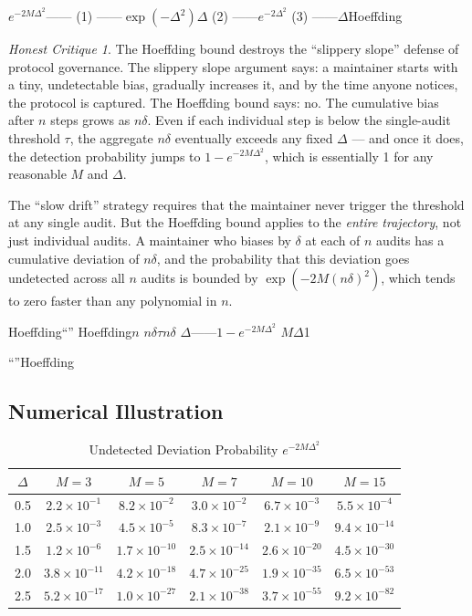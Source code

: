 \documentclass[12pt,a4paper]{article}
\theoremstyle{remark}
\newtheorem{honesthit}{Honest Critique}[section]
\newenvironment{hitbox}{%
  \begin{center}
  \color{red}
  \begin{minipage}{0.92\textwidth}
  \begin{honesthit}
}{%
  \end{honesthit}
  \end{minipage}
  \end{center}
}
\begin{document}
\noindent\textbf{}
$e^{-2M\Delta^2}$——
(1) ——$\exp(-\Delta^2)$$\Delta$
(2) ——$e^{-2\Delta^2}$
(3) ——$\Delta$Hoeffding

\begin{hitbox}
The Hoeffding bound destroys the ``slippery slope'' defense of protocol
governance. The slippery slope argument says: a maintainer starts with a tiny,
undetectable bias, gradually increases it, and by the time anyone notices, the
protocol is captured. The Hoeffding bound says: no. The cumulative bias after
$n$ steps grows as $n\delta$. Even if each individual step is below the
single-audit threshold $\tau$, the aggregate $n\delta$ eventually exceeds any
fixed $\Delta$ — and once it does, the detection probability jumps to
$1 - e^{-2M\Delta^2}$, which is essentially 1 for any reasonable $M$ and
$\Delta$.

The ``slow drift'' strategy requires that the maintainer never trigger the
threshold at any single audit. But the Hoeffding bound applies to the
\textit{entire trajectory}, not just individual audits. A maintainer who biases
by $\delta$ at each of $n$ audits has a cumulative deviation of $n\delta$, and
the probability that this deviation goes undetected across all $n$ audits is
bounded by $\exp(-2M (n\delta)^2)$, which tends to zero faster than any
polynomial in $n$.

\begin{center}
\small\textbf{}
Hoeffding“”
Hoeffding$n$
$n\delta$$\tau$$n\delta$
$\Delta$——$1 - e^{-2M\Delta^2}$
$M$$\Delta$1

“”Hoeffding
\end{center}
\end{hitbox}

\subsection{Numerical Illustration}

\begin{table}[H]
\centering
\caption{Undetected Deviation Probability $e^{-2M\Delta^2}$}
\label{tab:hoeffding}
\begin{tabular}{@{}c|ccccc@{}}
\toprule
$\Delta$ & $M=3$ & $M=5$ & $M=7$ & $M=10$ & $M=15$ \\
\midrule
0.5  & $2.2 \times 10^{-1}$ & $8.2 \times 10^{-2}$ & $3.0 \times 10^{-2}$ & $6.7 \times 10^{-3}$ & $5.5 \times 10^{-4}$ \\
1.0  & $2.5 \times 10^{-3}$ & $4.5 \times 10^{-5}$ & $8.3 \times 10^{-7}$ & $2.1 \times 10^{-9}$ & $9.4 \times 10^{-14}$ \\
1.5  & $1.2 \times 10^{-6}$ & $1.7 \times 10^{-10}$ & $2.5 \times 10^{-14}$ & $2.6 \times 10^{-20}$ & $4.5 \times 10^{-30}$ \\
2.0  & $3.8 \times 10^{-11}$ & $4.2 \times 10^{-18}$ & $4.7 \times 10^{-25}$ & $1.9 \times 10^{-35}$ & $6.5 \times 10^{-53}$ \\
2.5  & $5.2 \times 10^{-17}$ & $1.0 \times 10^{-27}$ & $2.1 \times 10^{-38}$ & $3.7 \times 10^{-55}$ & $9.2 \times 10^{-82}$ \\
\bottomrule
\end{tabular}
\end{table}
\end{document}
